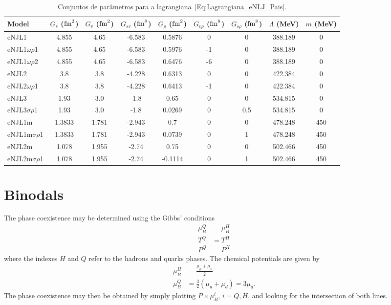 \documentclass[prc, reprint, amsmath, linenumbers,10pt]{revtex4-1}
\begin{document}
\begin{table*}
\caption{Conjuntos de parâmetros para a lagrangiana~\eqref{Eq:Lagrangiana_eNLJ_Pais}\cite{Pais2016}. \label{Tab:Parametros_eNJL}}
\begin{ruledtabular}
\begin{tabular}{lcccccccc}
Model & $G_s$ ($\rm{fm}^2$) & $G_v$ ($\rm{fm}^2$) & $G_{sv}$ ($\rm{fm}^8$) & $G_\rho$ ($\rm{fm}^2$) & $G_{v\rho}$ ($\rm{fm}^8$) & $G_{s\rho}$ ($\rm{fm}^8$) & $\Lambda$ (MeV) & $m$ (MeV) \\
\hline
eNJL1 & 4.855 & 4.65 & -6.583 & 0.5876 & 0 & 0 & 388.189 & 0 \\
eNJL1$\omega\rho$1 & 4.855 & 4.65 & -6.583 & 0.5976 & -1 & 0 & 388.189 & 0 \\
eNJL1$\omega\rho$2 & 4.855 & 4.65 & -6.583 & 0.6476 & -6 & 0 & 388.189 & 0 \\
eNJL2 & 3.8 & 3.8 & -4.228 & 0.6313 & 0 & 0 & 422.384 & 0 \\
eNJL2$\omega\rho$1 & 3.8 & 3.8 & -4.228 & 0.6413 & -1 & 0 & 422.384 & 0 \\
eNJL3 & 1.93 & 3.0 & -1.8 & 0.65 & 0 & 0 & 534.815 & 0 \\
eNJL3$\sigma\rho$1 & 1.93 & 3.0 & -1.8 & 0.0269 & 0 & 0.5 & 534.815 & 0 \\
eNJL1m & 1.3833 & 1.781 & -2.943 & 0.7 & 0 & 0 & 478.248 & 450 \\
eNJL1m$\sigma\rho$1 & 1.3833 & 1.781 & -2.943 & 0.0739 & 0 & 1 & 478.248 & 450 \\
eNJL2m & 1.078 & 1.955 & -2.74 & 0.75 & 0 & 0 & 502.466 & 450 \\
eNJL2m$\sigma\rho$1 & 1.078 & 1.955 & -2.74 & -0.1114 & 0 & 1 & 502.466 & 450 \\
\end{tabular}
\end{ruledtabular}
\end{table*}

\section{Binodals}

The phase coexistence may be determined using the Gibbs' conditions \cite{Cavagnoli2011}
\begin{align}
\mu_B^Q &= \mu_B^H \\
T^Q &= T^H \\
P^Q &= P^H
\end{align}
%
where the indexes $H$ and $Q$ refer to the hadrons and quarks phases. The chemical potentials are given by
\begin{align}
	\mu_B^H &= \frac{\mu_p + \mu_n}{2} \\
	\mu_B^Q &= \frac{3}{2} (\mu_u + \mu_d) = 3 \mu_q.
\end{align}
%
The phase coexistence may then be obtained by simply plotting $P \times \mu_B^i$, $i = Q, H$, and looking for the intersection of both lines.
\end{document}
